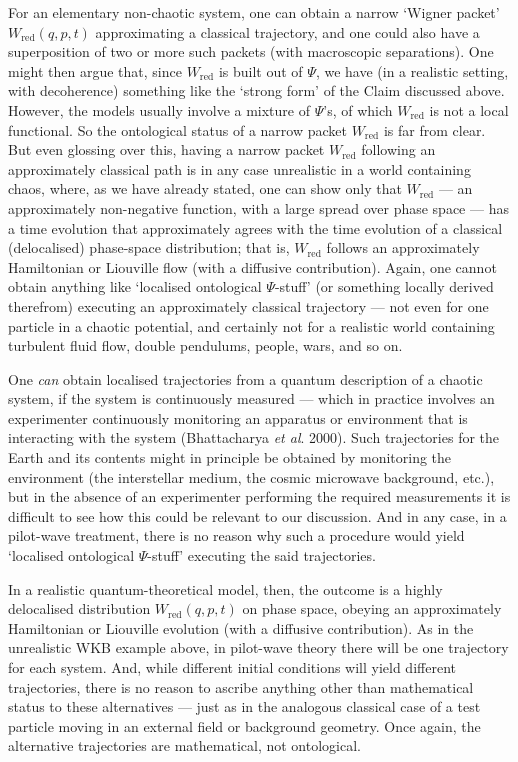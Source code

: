 \documentclass[12pt]{article}%
\begin{document}
For an elementary non-chaotic system, one can obtain a narrow `Wigner packet'
$W_{\mathrm{red}}(q,p,t)$ approximating a classical trajectory, and one could
also have a superposition of two or more such packets (with macroscopic
separations). One might then argue that, since $W_{\mathrm{red}}$ is built out
of $\Psi$, we have (in a realistic setting, with decoherence) something like
the `strong form' of the Claim discussed above. However, the models usually
involve a mixture of $\Psi$'s, of which $W_{\mathrm{red}}$ is not a local
functional. So the ontological status of a narrow packet $W_{\mathrm{red}}$ is
far from clear. But even glossing over this, having a narrow packet
$W_{\mathrm{red}}$ following an approximately classical path is in any case
unrealistic in a world containing chaos, where, as we have already stated, one
can show only that $W_{\mathrm{red}}$ --- an approximately non-negative
function, with a large spread over phase space --- has a time evolution that
approximately agrees with the time evolution of a classical (delocalised)
phase-space distribution; that is, $W_{\mathrm{red}}$ follows an approximately
Hamiltonian or Liouville flow (with a diffusive contribution). Again, one
cannot obtain anything like `localised ontological $\Psi$-stuff' (or something
locally derived therefrom) executing an approximately classical trajectory ---
not even for one particle in a chaotic potential, and certainly not for a
realistic world containing turbulent fluid flow, double pendulums, people,
wars, and so on.

One \textit{can} obtain localised trajectories from a quantum description of a
chaotic system, if the system is continuously measured --- which in practice
involves an experimenter continuously monitoring an apparatus or environment
that is interacting with the system (Bhattacharya \textit{et al}. 2000). Such
trajectories for the Earth and its contents might in principle be obtained by
monitoring the environment (the interstellar medium, the cosmic microwave
background, etc.), but in the absence of an experimenter performing the
required measurements it is difficult to see how this could be relevant to our
discussion. And in any case, in a pilot-wave treatment, there is no reason why
such a procedure would yield `localised ontological $\Psi$-stuff' executing
the said trajectories.

In a realistic quantum-theoretical model, then, the outcome is a highly
delocalised distribution $W_{\mathrm{red}}(q,p,t)$ on phase space, obeying an
approximately Hamiltonian or Liouville evolution (with a diffusive
contribution). As in the unrealistic WKB example above, in pilot-wave theory
there will be one trajectory for each system. And, while different initial
conditions will yield different trajectories, there is no reason to ascribe
anything other than mathematical status to these alternatives --- just as in
the analogous classical case of a test particle moving in an external field or
background geometry. Once again, the alternative trajectories are
mathematical, not ontological.
\end{document}

